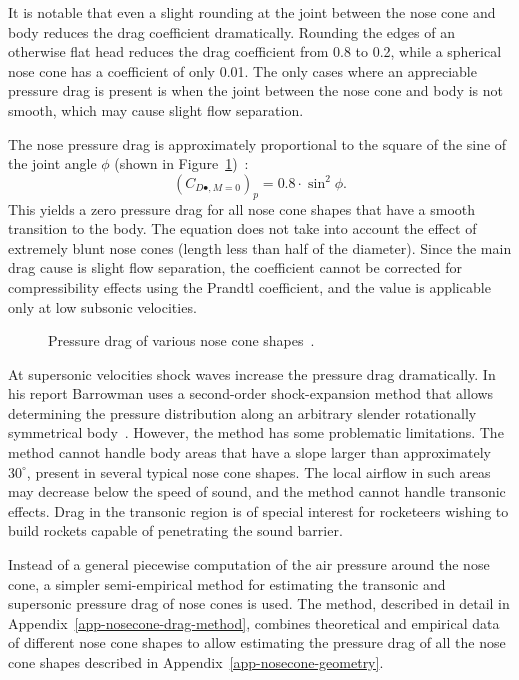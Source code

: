 It is notable that even a slight rounding at the joint between the nose
cone and body reduces the drag coefficient dramatically.  Rounding the
edges of an otherwise flat head reduces the drag coefficient from 0.8
to 0.2, while a spherical nose cone has a coefficient of only 0.01.
The only cases where an appreciable pressure drag is present is when
the joint between the nose cone and body is not smooth, which may
cause slight flow separation.

The nose pressure drag is approximately
proportional to the square of the sine of the joint angle $\phi$
(shown in
Figure~\ref{fig-nosecone-cd})~\cite[p.~237]{handbook-supersonic-aerodynamics}:
%
\begin{equation}
(C_{D\bullet,M=0})_p = 0.8 \cdot \sin^2\phi.
\label{eq-nosecone-pressure-drag}
\end{equation}
%
This yields a zero pressure drag for all nose cone shapes that have a
smooth transition to the body.  The equation does not take into
account the effect of extremely blunt nose cones (length less than
half of the diameter).  Since the main drag cause is slight flow
separation, the coefficient cannot be corrected for compressibility
effects using the Prandtl coefficient, and the value is applicable
only at low subsonic velocities.

\begin{figure}
\centering
{}
\caption{Pressure drag of various nose cone
  shapes~\cite[p.~3-12]{hoerner}.}
\label{fig-nosecone-cd}
\end{figure}


At supersonic velocities shock waves increase the pressure drag
dramatically. In his report Barrowman uses a second-order
shock-expansion method that allows determining the pressure
distribution along an arbitrary slender rotationally symmetrical
body~\cite{second-order-shock-expansion-method}.  However,
the method has some problematic limitations.  The method cannot handle
body areas that have a slope larger than approximately $30^\circ$,
present in several typical nose cone shapes.  The local airflow in
such areas may decrease below the speed of sound, and the method
cannot handle transonic effects.  Drag in the transonic
region is of special interest for rocketeers wishing to build rockets
capable of penetrating the sound barrier.

Instead of a general piecewise computation of the air pressure around
the nose cone, a simpler semi-empirical method for estimating the
transonic and supersonic pressure drag of nose cones is used.  The
method, described in detail in
Appendix~\ref{app-nosecone-drag-method}, combines theoretical and
empirical data of different nose cone shapes to allow estimating the
pressure drag of all the nose cone shapes described in
Appendix~\ref{app-nosecone-geometry}.

